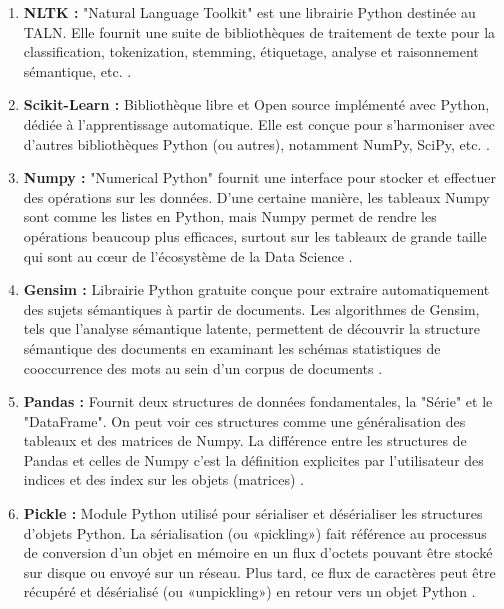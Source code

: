             \begin{enumerate}[leftmargin=*]
                \item{\textbf{NLTK : }}
                "Natural Language Toolkit" est une librairie Python destinée au TALN. Elle fournit une suite de bibliothèques de traitement de texte pour la classification, tokenization, stemming, étiquetage, analyse et raisonnement sémantique, etc. \cite{nltk}.\\

                \item{\textbf{Scikit-Learn : }\label{scikit-learn}}
                Bibliothèque libre et Open source implémenté avec Python, dédiée à l'apprentissage automatique. Elle est conçue pour s'harmoniser avec d'autres bibliothèques Python (ou autres), notamment NumPy, SciPy, etc. \cite{scikit}.\\

                \item{\textbf{Numpy : }}
                "Numerical Python" fournit une interface pour stocker et effectuer des opérations sur les données. D'une certaine manière, les tableaux Numpy sont comme les listes en Python, mais Numpy permet de rendre les opérations beaucoup plus efficaces, surtout sur les tableaux de grande taille qui sont au cœur de l'écosystème de la Data Science \cite{numpy}.\\
                
                \item{\textbf{Gensim : }}
                Librairie Python gratuite conçue pour extraire automatiquement des sujets sémantiques à partir de documents. Les algorithmes de Gensim, tels que l'analyse sémantique latente, permettent de découvrir la structure sémantique des documents en examinant les schémas statistiques de cooccurrence des mots au sein d'un corpus de documents \cite{gensim}.\\

                \item{\textbf{Pandas : }}
                Fournit deux structures de données fondamentales, la "Série" et le "DataFrame". On peut voir ces structures comme une généralisation des tableaux et des matrices de Numpy. La différence entre les structures de Pandas et celles de Numpy c'est la définition explicites par l'utilisateur des indices et des index sur les objets (matrices) .\cite{pandas}\\

                \item{\textbf{Pickle : }}
                Module Python utilisé pour sérialiser et désérialiser les structures d'objets Python. La sérialisation (ou «pickling») fait référence au processus de conversion d'un objet en mémoire en un flux d'octets pouvant être stocké sur disque ou envoyé sur un réseau. Plus tard, ce flux de caractères peut être récupéré et désérialisé (ou «unpickling») en retour vers un objet Python \cite{pickle}.\\


\end{enumerate}

